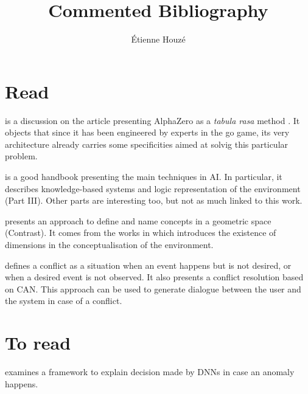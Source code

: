 \documentclass{article}
\title{Commented Bibliography}
\author{\'Etienne Houzé}
\date{}
\begin{document}
\maketitle
    \section{Read}

    \cite{marcus2018innateness} is a discussion on the article presenting AlphaZero as a \emph{tabula rasa} method \cite{silver2017mastering}. It objects that since it has been engineered by experts in the go game, its very architecture already carries some specificities aimed at solvig this particular problem.

    \cite{russell2016artificial} is a good handbook presenting the main techniques in AI. In particular, it describes knowledge-based systems and logic representation of the environment (Part III). Other parts are interesting too, but not as much linked to this work.

    \cite{dessalles2015conceptual}  presents an approach to define and name concepts in a geometric space (Contrast). It comes from the works in \cite{gardenfors2004conceptual} which introduces the existence of dimensions in the conceptualisation of the environment.

    \cite{dessalles2008computational} defines a conflict as a situation when an event happens but is not desired, or when a desired event is not observed. It also presents a conflict resolution based on CAN. This approach can be used to generate dialogue between the user and the system in case of a conflict.

    \section{To read}

    \cite{amarasinghe2018toward} examines a framework to explain decision made by DNNs in case an anomaly happens.
\newpage


\end{document}
